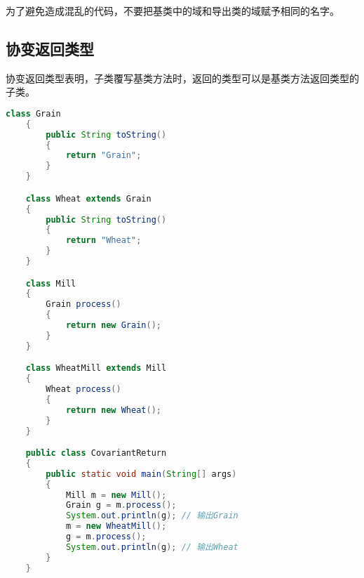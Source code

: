 \documentclass[a4paper,left=2.5cm,right=2.5cm,11pt]{article}
\begin{document}
	为了避免造成混乱的代码，不要把基类中的域和导出类的域赋予相同的名字。

\subsection{协变返回类型}
	协变返回类型表明，子类覆写基类方法时，返回的类型可以是基类方法返回类型的子类。

	\begin{lstlisting}[language = Java]
	class Grain
	{
		public String toString()
		{
			return "Grain";
		}
	}

	class Wheat extends Grain
	{
		public String toString()
		{
			return "Wheat";
		}
	}

	class Mill
	{
		Grain process()
		{
			return new Grain();
		}
	}

	class WheatMill extends Mill
	{
		Wheat process()
		{
			return new Wheat();
		}
	}

	public class CovariantReturn
	{
		public static void main(String[] args)
		{
			Mill m = new Mill();
			Grain g = m.process();
			System.out.println(g); // 输出Grain
			m = new WheatMill();
			g = m.process();
			System.out.println(g); // 输出Wheat
		}
	}
	\end{lstlisting}

	
\end{document}
